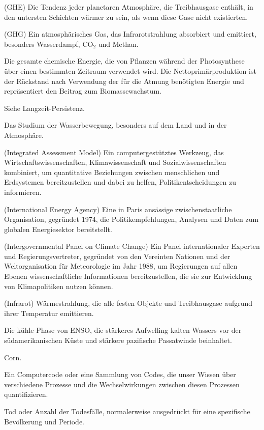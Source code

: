 \documentclass[12pt,paper=a4,DIV=12,parskip=never,chapterprefix=false,headings=standardclasses]{scrreprt}
\begin{document}
\begin{glossar}
\item[TREIBHAUSEFFEKT] (GHE) Die Tendenz jeder planetaren Atmosphäre, die Treibhausgase enthält, in den untersten Schichten wärmer zu sein, als wenn diese Gase nicht existierten.
\item[TREIBHAUSGAS] (GHG) Ein atmosphärisches Gas, das Infrarotstrahlung absorbiert und emittiert, besonders Wasserdampf, CO$_2$ und Methan.
\item[BRUTTOPRIMÄRPRODUKTION] Die gesamte chemische Energie, die von Pflanzen während der Photosynthese über einen bestimmten Zeitraum verwendet wird. Die Nettoprimärproduktion ist der Rückstand nach Verwendung der für die Atmung benötigten Energie und repräsentiert den Beitrag zum Biomassewachstum.
\item[HURST-PHÄNOMEN] Siehe Langzeit-Persistenz.
\item[HYDROLOGIE] Das Studium der Wasserbewegung, besonders auf dem Land und in der Atmosphäre.
\item[IAM] (Integrated Assessment Model) Ein computergestütztes Werkzeug, das Wirtschaftswissenschaften, Klimawissenschaft und Sozialwissenschaften kombiniert, um quantitative Beziehungen zwischen menschlichen und Erdsystemen bereitzustellen und dabei zu helfen, Politikentscheidungen zu informieren.
\item[IEA] (International Energy Agency) Eine in Paris ansässige zwischenstaatliche Organisation, gegründet 1974, die Politikempfehlungen, Analysen und Daten zum globalen Energiesektor bereitstellt.
\item[IPCC] (Intergovernmental Panel on Climate Change) Ein Panel internationaler Experten und Regierungsvertreter, gegründet von den Vereinten Nationen und der Weltorganisation für Meteorologie im Jahr 1988, um Regierungen auf allen Ebenen wissenschaftliche Informationen bereitzustellen, die sie zur Entwicklung von Klimapolitiken nutzen können.
\item[IR] (Infrarot) Wärmestrahlung, die alle festen Objekte und Treibhausgase aufgrund ihrer Temperatur emittieren.
\item[LA NIÑA] Die kühle Phase von ENSO, die stärkeres Aufwelling kalten Wassers vor der südamerikanischen Küste und stärkere pazifische Passatwinde beinhaltet.
\item[MAIS] Corn.
\item[MODELL] Ein Computercode oder eine Sammlung von Codes, die unser Wissen über verschiedene Prozesse und die Wechselwirkungen zwischen diesen Prozessen quantifizieren.
\item[MORTALITÄT] Tod oder Anzahl der Todesfälle, normalerweise ausgedrückt für eine spezifische Bevölkerung und Periode.

\end{glossar}
\end{document}
